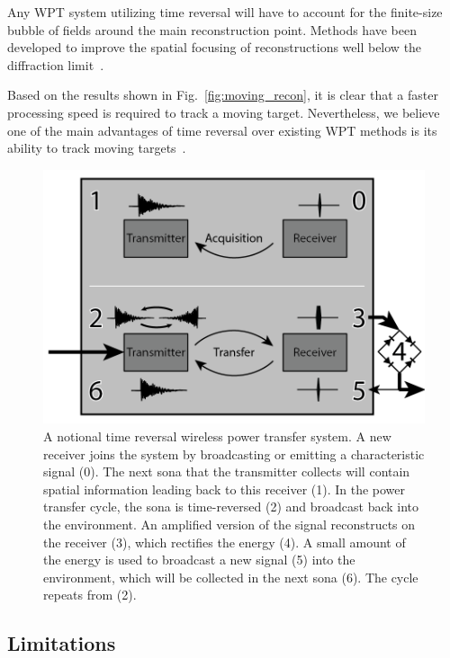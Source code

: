Any WPT system utilizing time reversal will have to account for the
finite-size bubble of fields around the main reconstruction point.
Methods have been developed to improve the spatial focusing of reconstructions
well below the diffraction limit~\cite{lerosey-focusing}.

Based on the results shown in Fig.~\ref{fig:moving_recon}, it is clear that a faster
processing speed is required to track a moving target.
%
Nevertheless, we believe one of the main advantages of time reversal over
existing WPT methods is its ability to track moving
targets~\cite{fink,nltr-wave-chaotic}.


\begin{figure}[t]
\includegraphics[width=\columnwidth]{figs/WPTSys.png}
\caption{A notional time reversal wireless power transfer system. A new receiver joins the system by broadcasting or emitting a characteristic signal (0). The next sona that the transmitter collects will contain spatial information leading back to this receiver (1). In the power transfer cycle, the sona is time-reversed (2) and broadcast back into the environment. An amplified version of the signal reconstructs on the receiver (3), which rectifies the energy (4). A small amount of the energy is used to broadcast a new signal (5) into the environment, which will be collected in the next sona (6). The cycle repeats from (2).}
\label{fig:SysImage}
\end{figure}

\subsection{Limitations}
\label{sec:limitations}


